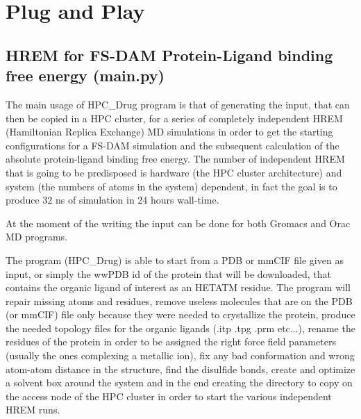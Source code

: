 

\section{Plug and Play}

	\subsection{HREM for FS-DAM Protein-Ligand binding free energy (main.py)}
	
		The main usage of HPC\_Drug program is that of generating the input, that can then be copied in a HPC cluster, for a series of completely independent HREM (Hamiltonian Replica Exchange) MD simulations in order to get the starting configurations for a FS-DAM simulation and the subsequent calculation of the absolute protein-ligand binding free energy. The number of independent HREM that is going to be predisposed is hardware (the HPC cluster architecture) and system (the numbers of atoms in the system) dependent, in fact the goal is to produce 32 ns of simulation in 24 hours wall-time.
		
		At the moment of the writing the input can be done for both Gromacs\cite{gromacs_ABRAHAM201519} and Orac\cite{orac} MD programs.
		
		The program (HPC\_Drug) is able to start from a PDB or mmCIF file given as input, or simply the wwPDB id of the protein that will be downloaded, that contains the organic ligand of interest as an HETATM residue. The program will repair missing atoms and residues, remove useless molecules that are on the PDB (or mmCIF) file only because they were needed to crystallize the protein, produce the needed topology files for the organic ligands (.itp .tpg .prm etc...), rename the residues of the protein in order to be assigned the right force field parameters (usually the ones complexing a metallic ion), fix any bad conformation and wrong atom-atom distance in the structure, find the disulfide bonds, create and optimize a solvent box around the system and in the end creating the directory to copy on the access node of the HPC cluster in order to start the various independent HREM runs.
		
